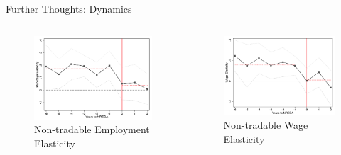 \begin{frame}{Further Thoughts: Dynamics}
    \begin{columns}[T]
        \begin{column}{0.45\textwidth}
            \begin{figure}
                \centering
                \includegraphics[height = 0.54 \textheight]{images/pretrend2.png}
                {\small Non-tradable Employment Elasticity}
                \end{figure}
        \end{column}

        \begin{column}{0.45\textwidth}
            \begin{figure}
                \centering
                \includegraphics[height = 0.54 \textheight]{images/pretrend3.png}
                {\small Non-tradable Wage Elasticity}
                \end{figure}
        \end{column}
    \end{columns}
\end{frame}

